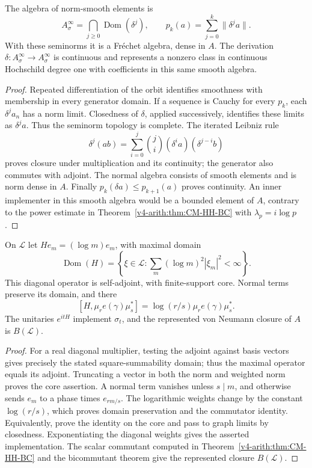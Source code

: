 \begin{proposition}
\label{v4-arith:bc:smooth-HH1}
The algebra of norm-smooth elements is
\[
 A_\sigma^\infty=\bigcap_{j\ge0}\operatorname{Dom}(\delta^j),
 \qquad p_k(a)=\sum_{j=0}^k\|\delta^j a\|.
\]
With these seminorms it is a Fr\'echet algebra, dense in \(A\).
The derivation \(\delta:A_\sigma^\infty\to A_\sigma^\infty\)
is continuous and represents a nonzero class in continuous
Hochschild degree one with coefficients in this same smooth algebra.
\end{proposition}
\begin{proof}
Repeated differentiation of the orbit identifies smoothness with
membership in every generator domain. If a sequence is Cauchy for
every \(p_k\), each \(\delta^j a_n\) has a norm limit. Closedness
of \(\delta\), applied successively, identifies these limits as
\(\delta^j a\). Thus the seminorm topology is complete. The
iterated Leibniz rule
\[
 \delta^j(ab)=\sum_{i=0}^j\binom ji(\delta^i a)(\delta^{j-i}b)
\]
proves closure under multiplication and its continuity; the generator
also commutes with adjoint. The normal algebra consists of smooth
elements and is norm dense in \(A\). Finally
\(p_k(\delta a)\le p_{k+1}(a)\) proves continuity. An inner
implementer in this smooth algebra would be a bounded element of
\(A\), contrary to the power estimate in
Theorem~\ref{v4-arith:thm:CM-HH-BC} with \(\lambda_p=i\log p\).
\end{proof}

\begin{proposition}
\label{v4-arith:bc:H-domain-and-closure}
On \(\mathcal L\) let \(He_m=(\log m)e_m\), with maximal domain
\[
 \operatorname{Dom}(H)=
 \left\{\xi\in\mathcal L:\sum_m(\log m)^2|\xi_m|^2<\infty\right\}.
\]
This diagonal operator is self-adjoint, with finite-support core.
Normal terms preserve its domain, and there
\[
 [H,\mu_r e(\gamma)\mu_s^*]
 =\log(r/s)\mu_r e(\gamma)\mu_s^*.
\]
The unitaries \(e^{itH}\) implement \(\sigma_t\), and the represented
von Neumann closure of \(A\) is \(B(\mathcal L)\).
\end{proposition}
\begin{proof}
For a real diagonal multiplier, testing the adjoint against basis
vectors gives precisely the stated square-summability domain;
thus the maximal operator equals its adjoint. Truncating a vector
in both the norm and weighted norm proves the core assertion.
A normal term vanishes unless \(s\mid m\), and otherwise sends
\(e_m\) to a phase times \(e_{rm/s}\). The logarithmic weights
change by the constant \(\log(r/s)\), which proves domain preservation
and the commutator identity. Equivalently, prove the identity on
the core and pass to graph limits by closedness. Exponentiating the
diagonal weights gives the asserted implementation. The scalar
commutant computed in Theorem~\ref{v4-arith:thm:CM-HH-BC} and the
bicommutant theorem give the represented closure \(B(\mathcal L)\).
\end{proof}

